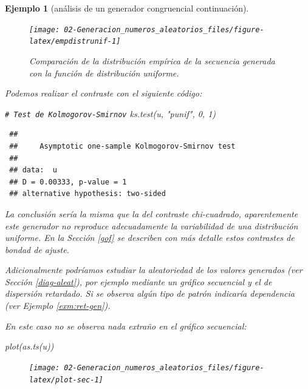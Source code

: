 \documentclass[
  10pt,
]{book}
\newenvironment{Shaded}{\begin{snugshade}}{\end{snugshade}}
\newcommand{\CommentTok}[1]{\textcolor[rgb]{0.56,0.35,0.01}{\textit{#1}}}
\newcommand{\DecValTok}[1]{\textcolor[rgb]{0.00,0.00,0.81}{#1}}
\newcommand{\FunctionTok}[1]{\textcolor[rgb]{0.00,0.00,0.00}{#1}}
\newcommand{\NormalTok}[1]{#1}
\newcommand{\StringTok}[1]{\textcolor[rgb]{0.31,0.60,0.02}{#1}}
\theoremstyle{break}
\newtheorem{example}{Ejemplo}[chapter]
\theoremstyle{nonumberplain}
\renewcommand{\CommentTok}[1]{\textcolor[rgb]{0.41,0.41,0.41}{\texttt{#1}}}
\begin{document}
\begin{example}[análisis de un generador congruencial continuación]
\begin{figure}[!htbp]

{\centering \texttt{[image: 02-Generacion\_numeros\_aleatorios\_files/figure-latex/empdistrunif-1]} 

}

\caption{Comparación de la distribución empírica de la secuencia generada con la función de distribución uniforme.}\label{fig:empdistrunif}
\end{figure}

Podemos realizar el contraste con el siguiente código:

\begin{Shaded}
\begin{Highlighting}[]
\CommentTok{\# Test de Kolmogorov{-}Smirnov}
\FunctionTok{ks.test}\NormalTok{(u, }\StringTok{"punif"}\NormalTok{, }\DecValTok{0}\NormalTok{, }\DecValTok{1}\NormalTok{)}
\end{Highlighting}
\end{Shaded}

\begin{verbatim}
 ## 
 ##     Asymptotic one-sample Kolmogorov-Smirnov test
 ## 
 ## data:  u
 ## D = 0.00333, p-value = 1
 ## alternative hypothesis: two-sided
\end{verbatim}

La conclusión sería la misma que la del contraste chi-cuadrado, aparentemente este generador no reproduce adecuadamente la variabilidad de una distribución uniforme.
En la Sección \ref{gof} se describen con más detalle estos contrastes de bondad de ajuste.

Adicionalmente podríamos estudiar la aleatoriedad de los valores generados (ver Sección \ref{diag-aleat}), por ejemplo mediante un gráfico secuencial y el de dispersión retardado.
Si se observa algún tipo de patrón indicaría dependencia (ver Ejemplo \ref{exm:ret-gen}).

En este caso no se observa nada extraño en el gráfico secuencial:

\begin{Shaded}
\begin{Highlighting}[]
\FunctionTok{plot}\NormalTok{(}\FunctionTok{as.ts}\NormalTok{(u))}
\end{Highlighting}
\end{Shaded}

\begin{figure}[!htbp]

{\centering \texttt{[image: 02-Generacion\_numeros\_aleatorios\_files/figure-latex/plot-sec-1]} 

}
\end{figure}
\end{example}
\end{document}
